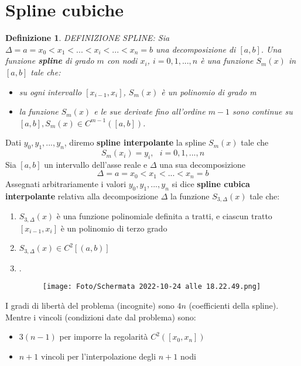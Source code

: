 \documentclass[a4paper, portrait]{book}
\numberwithin{equation}{chapter} %
\newtheorem{definition}{Definizione}
\begin{document}
\section{Spline cubiche}
\begin{definition}
    DEFINIZIONE SPLINE: Sia $\Delta = {a = x_0 < x_1 < ... < x_i < ... < x_n = b}$ una decomposizione di $[a,b]$. Una funzione \textbf{spline} di grado $m$ con nodi $x_i$, $i= 0,1,...,n$ è una funzione $S_m(x)$ in $[a,b]$ tale che:
    \begin{itemize}
        \item su ogni intervallo $[x_{i-1},x_i]$, $S_m(x)$ è un polinomio di grado m
        \item la funzione $S_m(x)$ e le sue derivate fino all'ordine $m-1$ sono continue su $[a,b], S_m(x) \in C^{m-1}([a,b])$.\\
    \end{itemize}
\end{definition}
Dati $y_0,y_1,...,y_n$, diremo \textbf{spline interpolante} la spline $S_m(x)$ tale che
\begin{equation}
    S_m(x_i) = y_i, \ \ \ i = 0,1,...,n
\end{equation}
Sia $[a,b]$ un intervallo dell'asse reale e $\Delta$ una sua decomposizione
\begin{equation}
    \Delta = {a = x_0 < x_1 < ... < x_n = b}
\end{equation}
Assegnati arbitrariamente i valori $y_0,y_1,...,y_n$ si dice \textbf{spline cubica interpolante} relativa alla decomposizione $\Delta$ la funzione $S_{3,\Delta}(x)$ tale che:
\begin{enumerate}
    \item $S_{3,\Delta}(x)$ è una funzione polinomiale definita a tratti, e ciascun tratto $[x_{i-1},x_i]$ è un polinomio di terzo grado
    \item $S_{3,\Delta}(x) \in C^2[(a,b)]$
    \item .\begin{figure}[h!]
        \centering
        \texttt{[image: Foto/Schermata 2022-10-24 alle 18.22.49.png]}
        \caption{}
    \end{figure}
\end{enumerate}
I gradi di libertà del problema (incognite) sono $4n$ (coefficienti della spline).\\
Mentre i vincoli (condizioni date dal problema) sono:
\begin{itemize}
    \item $3(n-1)$ per imporre la regolarità $C^2([x_0,x_n])$
    \item $n+1$ vincoli per l'interpolazione degli $n+1$ nodi
\end{itemize}
\end{document}
